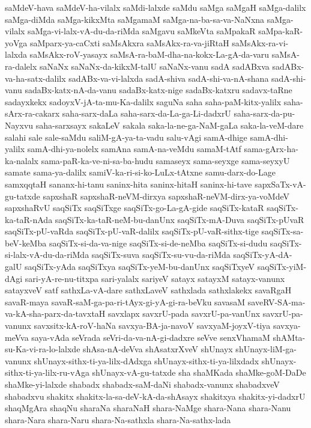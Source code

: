 {saMdeV-hava
saMdeV-ha-vilalx
saMdi-lalxde
saMdu
saMga
saMgaH
saMga-dalilx
saMga-diMda
saMga-kikxMta
saMgamaM
saMga-na-ba-sa-va-NaNxna
saMga-vilalx
saMga-vi-lalx-vA-du-da-riMda
saMgavu
saMkeVta
saMpakaR
saMpa-kaR-yoVga
saMparx-ya-caCxti
saMsAkxra
saMsAkx-ra-va-jiRtaH
saMsAkx-ra-vi-lalxda
saMsAkx-roV-yasayx
saMsA-ra-baM-dha-na-kokx-La-gA-da-varu
saMsA-ra-dalelx
saNaNx
saNaNx-da-kikxM-talU
saNaNx-vanu
sadA
sadABxva
sadABx-va-ha-satx-dalilx
sadABx-va-vi-lalxda
sadA-shiva
sadA-shi-va-nA-shana
sadA-shi-vanu
sadaBx-katx-nA-da-vanu
sadaBx-katx-nige
sadaBx-katxru
sadavx-taRne
sadayxkekx
sadoyxV-jA-ta-mu-Ka-dalilx
saguNa
saha
saha-paM-kitx-yalilx
saha-sArx-ra-cakarx
saha-sarx-daLa
saha-sarx-da-La-ga-Li-dadxrU
saha-sarx-da-pu-Nayxvu
saha-sarxsayx
sakaLeV
sakala
saka-la-ne-ga-NaM-gaLa
saka-la-veM-dare
salahi
sale
sale-saMdu
saliM-gA-ya-ta-vadu
salu-vAgi
samA-dhige
samA-dhi-yalilx
samA-dhi-ya-nolelx
samAna
samA-na-veMdu
samaM-tAtf
sama-gArx-ha-ka-nalalx
sama-paR-ka-ve-ni-sa-ba-hudu
samaseyx
sama-seyxge
sama-seyxyU
samate
sama-ya-dalilx
samiV-ka-ri-si-ko-LuLx-tAtxne
samu-darx-do-Lage
samxqqtaH
sananx-hi-tanu
saninx-hita
saninx-hitaH
saninx-hi-tave
sapxSaTx-vA-gu-tatxde
sapxshaR
sapxshaR-neVM-dirxya
sapxshaR-neVM-dirx-ya-voMdeV
sapxshaRvU
saqSiTx
saqSiTxge
saqSiTx-go-La-gA-gide
saqSiTx-kataR
saqSiTx-ka-taR-nAda
saqSiTx-ka-taR-neM-bu-danUnx
saqSiTx-mA-Duva
saqSiTx-pUvaR
saqSiTx-pU-vaRda
saqSiTx-pU-vaR-dalilx
saqSiTx-pU-vaR-sithx-tige
saqSiTx-sa-beV-keMba
saqSiTx-si-da-va-nige
saqSiTx-si-de-neMba
saqSiTx-si-dudu
saqSiTx-si-lalx-vA-du-da-riMda
saqSiTx-suva
saqSiTx-su-vu-da-riMda
saqSiTx-yA-dA-galU
saqSiTx-yAda
saqSiTxya
saqSiTx-yeM-bu-danUnx
saqSiTxyeV
saqSiTx-yiM-dAgi
sari-yA-re-nu-titxpa
sari-yalalx
sariyeV
satayx
satayxM
satayx-vanunx
satayxveV
satf
sathxLa-vA-dare
sathxLaveV
sathxlada
sathxlakekx
savaRgaH
savaR-maya
savaR-saM-ga-pa-ri-tAyx-gi-yA-gi-ra-beVku
savasaM
saveRV-SA-ma-va-kA-sha-parx-da-tavxtaH
savxlapx
savxrU-pada
savxrU-pa-vanUnx
savxrU-pa-vanunx
savxsitx-kA-roV-haNa
savxya-BA-ja-navoV
savxyaM-joyxV-tiya
savxya-meVva
saya-vAda
seVrada
seVri-da-va-nA-gi-dadxre
seVve
senxVhamaM
shAMta-su-Ka-vi-ra-lo-lalxde
shAsa-nA-deVva
shAsatxrXveV
shUnayx
shUnayx-liM-ga-vanunx
shUnayx-sithx-ti-ya-lilx-dAdxga
shUnayx-sithx-ti-ya-lilxdadx
shUnayx-sithx-ti-ya-lilx-ru-vAga
shUnayx-vA-gu-tatxde
sha
shaMKada
shaMke-goM-DaDe
shaMke-yi-lalxde
shabadx
shabadx-saM-daNi
shabadx-vanunx
shabadxveV
shabadxvu
shakitx
shakitx-la-sa-deV-kA-da-shAsayx
shakitxya
shakitx-yi-dadxrU
shaqMgAra
shaqNu
sharaNa
sharaNaH
shara-NaMge
shara-Nana
shara-Nanu
shara-Nara
shara-Naru
shara-Na-sathxla
shara-Na-sathx-lada
}
